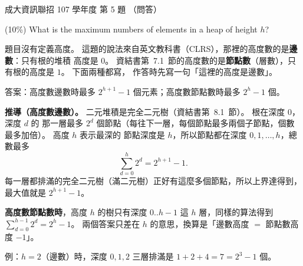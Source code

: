 \begin{pastexam}[label={px:ncku-107-prog-05}]{成大資訊聯招 107 學年度 第 5 題}
（問答）

(10\%) What is the maximum numbers of elements in a heap of height $h$?
\end{pastexam}

\begin{pastsoln}
題目沒有定義高度。 這題的說法來自英文教科書（CLRS），那裡的高度數的是\textbf{邊數}：只有根的堆積
高度是 $0$。 資結書第~7.1~節的高度數的是\textbf{節點數}（層數），只有根的高度是 $1$。 下面兩種都寫，
作答時先寫一句「這裡的高度是邊數」。

答案：高度數邊數時最多 $2^{h+1} - 1$ 個元素；高度數節點數時最多 $2^{h} - 1$ 個。

\textbf{推導（高度數邊數）。} 二元堆積是完全二元樹（資結書第~8.1~節）。 根在深度 $0$，深度 $d$ 的
那一層最多 $2^d$ 個節點（每往下一層，每個節點最多兩個子節點，個數最多加倍）。 高度 $h$ 表示最深的
節點深度是 $h$，所以節點都在深度 $0, 1, \ldots, h$，總數最多
\[
\sum_{d=0}^{h} 2^d = 2^{h+1} - 1 .
\]
每一層都排滿的完全二元樹（滿二元樹）正好有這麼多個節點，所以上界達得到，最大值就是 $2^{h+1} - 1$。

\textbf{高度數節點數時}，高度 $h$ 的樹只有深度 $0..h-1$ 這 $h$ 層，同樣的算法得到
$\sum_{d=0}^{h-1} 2^d = 2^h - 1$。 兩個答案只差在 $h$ 的意思，換算是「邊數高度 $=$ 節點數高度 $- 1$」。

例：$h = 2$（邊數）時，深度 $0, 1, 2$ 三層排滿是 $1 + 2 + 4 = 7 = 2^3 - 1$ 個。
\end{pastsoln}
